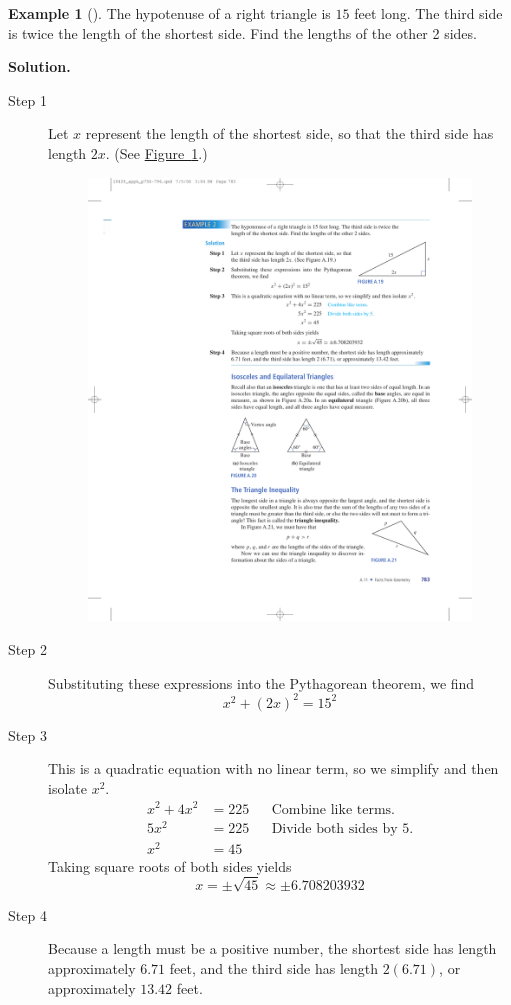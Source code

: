 \documentclass[10pt,]{book}
\theoremstyle{plain}
\theoremstyle{definition}
\theoremstyle{definition}
\newtheorem{example}[theorem]{Example}
\theoremstyle{definition}
\numberwithin{equation}{part}
\newcommand{\amp}{&}
\begin{document}
\begin{example}[]\label{example-81}
The hypotenuse of a right triangle is \(15\) feet long. The third side is twice the length of the shortest side. Find the lengths of the other 2 sides.%
\par\medskip\noindent%
\textbf{Solution.}\quad \leavevmode%
\begin{description}
\item[{Step 1}]\hypertarget{li-366}{}Let \(x\) represent the length of the shortest side, so that the third side has length \(2x\). (See \hyperref[fig-right-triangle4]{Figure~\ref{fig-right-triangle4}}.) \leavevmode%
\begin{figure}
\centering
\includegraphics[width=0.6\linewidth]{images/fig-right-triangle4}
\caption{\label{fig-right-triangle4}}
\end{figure}
%
\item[{Step 2}]\hypertarget{li-367}{}Substituting these expressions into the Pythagorean theorem, we find%
\begin{equation*}
x^2+(2x)^2=15^2
\end{equation*}
%
\item[{Step 3}]\hypertarget{li-368}{}This is a quadratic equation with no linear term, so we simplify and then isolate \(x^2\).%
\begin{align*}
x^2+4x^2\amp =225\amp\amp\text{Combine like terms.} \\
5x^2\amp = 225\amp\amp\text{Divide both sides by 5.} \\
x^2\amp = 45
\end{align*}
Taking square roots of both sides yields%
\begin{equation*}
x=\pm\sqrt{45}\approx\pm 6.708203932 
\end{equation*}
%
\item[{Step 4}]\hypertarget{li-369}{}Because a length must be a positive number, the shortest side has length approximately \(6.71\) feet, and the third side has length \(2 (6.71)\), or approximately \(13.42\) feet.%
\end{description}
%
\end{example}
\typeout{************************************************}
\typeout{************************************************}
\end{document}
